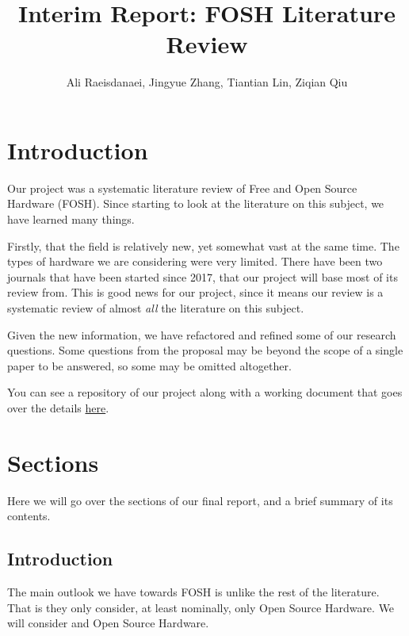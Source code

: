 \documentclass{article}
\begin{document}


\title{Interim Report: FOSH Literature Review}
\author{Ali Raeisdanaei, Jingyue Zhang, Tiantian Lin, Ziqian Qiu }
\date{}
\maketitle

\section{Introduction}

Our project was a systematic literature review of Free and Open Source Hardware (FOSH).
Since starting to look at the literature on this subject, we have learned many things. 

Firstly, that the field is relatively new, yet somewhat vast at the same time. 
The types of hardware we are considering were very limited.
There have been two journals that have been started since 2017, that our project will base most of its review from. 
This is good news for our project, since it means our review is a systematic review of almost \textit{all} the literature on this subject. 

Given the new information, we have refactored and refined some of our research questions. 
Some questions from the proposal may be beyond the scope of a single paper to be answered, so some may be omitted altogether. 

You can see a repository of our project along with a working document that goes over the details
\href{https://github.com/aliraeisdanaei/FOSH_Lit_Review/}{here}.

\section{Sections}

Here we will go over the sections of our final report, and a brief summary of its contents. 

\subsection{Introduction}
The main outlook we have towards FOSH is unlike the rest of the literature. 
That is they only consider, at least nominally, only Open Source Hardware. 
We will consider  and Open Source Hardware. 
\end{document}
